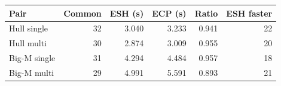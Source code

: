\begin{tabular}{lrrrrr}
\toprule
Pair & Common & ESH (s) & ECP (s) & Ratio & ESH faster \\
\midrule
Hull single & 32 & 3.040 & 3.233 & 0.941 & 22 \\
Hull multi & 30 & 2.874 & 3.009 & 0.955 & 20 \\
Big-M single & 31 & 4.294 & 4.484 & 0.957 & 18 \\
Big-M multi & 29 & 4.991 & 5.591 & 0.893 & 21 \\
\bottomrule
\end{tabular}
